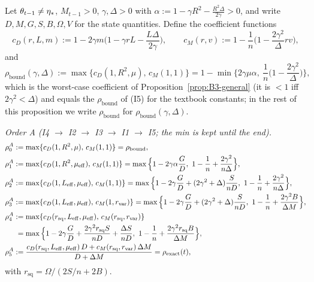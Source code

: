 \begin{proposition}\label{prop:B3-attribution}
Let $\theta_{t-1}\ne\eta_\ast$, $M_{t-1}>0$, $\gamma,\Delta>0$ with $\alpha:=1-\gamma R^2-\frac{R^2\Delta}{2\gamma}>0$, and write $D,M,G,S,B,\Omega,V$ for the state quantities. Define the coefficient functions
\[
c_D(r,L,m):=1-2\gamma m\Big(1-\gamma rL-\frac{L\Delta}{2\gamma}\Big),\qquad
c_M(r,v):=1-\frac1n\Big(1-\frac{2\gamma^2}{\Delta}rv\Big),
\]
and
\[
\rho_{\mathrm{bound}}(\gamma,\Delta):=\max\{c_D(1,R^2,\mu),\,c_M(1,1)\}=1-\min\Big\{2\gamma\mu\alpha,\ \frac1n\Big(1-\frac{2\gamma^2}{\Delta}\Big)\Big\},
\]
which is the worst-case coefficient of Proposition~\ref{prop:B3-general} (it is $<1$ iff $2\gamma^2<\Delta$) and equals the $\rho_{\mathrm{bound}}$ of (I5) for the textbook constants; in the rest of this proposition we write $\rho_{\mathrm{bound}}$ for $\rho_{\mathrm{bound}}(\gamma,\Delta)$.

\emph{Order A (I4 $\to$ I2 $\to$ I3 $\to$ I1 $\to$ I5; the min is kept until the end).}
\begin{align*}
\rho^{A}_0&:=\max\{c_D(1,R^2,\mu),\,c_M(1,1)\}=\rho_{\mathrm{bound}},\\
\rho^{A}_1&:=\max\{c_D(1,R^2,\muEff),\,c_M(1,1)\}
 =\max\Big\{1-2\gamma\alpha\frac GD,\ 1-\frac1n+\frac{2\gamma^2}{n\Delta}\Big\},\\
\rho^{A}_2&:=\max\{c_D(1,\LEff,\muEff),\,c_M(1,1)\}
 =\max\Big\{1-2\gamma\frac GD+(2\gamma^2+\Delta)\frac{S}{nD},\ 1-\frac1n+\frac{2\gamma^2}{n\Delta}\Big\},\\
\rho^{A}_3&:=\max\{c_D(1,\LEff,\muEff),\,c_M(1,r_{\mathrm{var}})\}
 =\max\Big\{1-2\gamma\frac GD+(2\gamma^2+\Delta)\frac{S}{nD},\ 1-\frac1n+\frac{2\gamma^2B}{\Delta M}\Big\},\\
\rho^{A}_4&:=\max\{c_D(r_{\mathrm{sq}},\LEff,\muEff),\,c_M(r_{\mathrm{sq}},r_{\mathrm{var}})\}\\
&\phantom{:}=\max\Big\{1-2\gamma\frac GD+\frac{2\gamma^2r_{\mathrm{sq}}S}{nD}+\frac{\Delta S}{nD},\ 1-\frac1n+\frac{2\gamma^2r_{\mathrm{sq}}B}{\Delta M}\Big\},\\
\rho^{A}_5&:=\frac{c_D(r_{\mathrm{sq}},\LEff,\muEff)\,D+c_M(r_{\mathrm{sq}},r_{\mathrm{var}})\,\Delta M}{D+\Delta M}=\rho_{\mathrm{exact}}(t),
\end{align*}
with $r_{\mathrm{sq}}=\Omega/(2S/n+2B)$.


\end{proposition}
